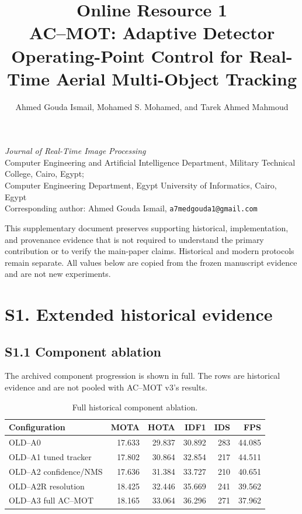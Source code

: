 \documentclass[11pt]{article}
\title{Online Resource 1\\[2pt]
AC--MOT: Adaptive Detector Operating-Point Control for Real-Time Aerial Multi-Object Tracking}
\author{Ahmed Gouda Ismail, Mohamed S. Mohamed, and Tarek Ahmed Mahmoud}
\date{}
\begin{document}
\maketitle

\begin{center}
\textit{Journal of Real-Time Image Processing}\\
Computer Engineering and Artificial Intelligence Department, Military Technical College, Cairo, Egypt;\\
Computer Engineering Department, Egypt University of Informatics, Cairo, Egypt\\
Corresponding author: Ahmed Gouda Ismail, \texttt{a7medgouda1@gmail.com}
\end{center}

This supplementary document preserves supporting historical, implementation, and
provenance evidence that is not required to understand the primary contribution
or to verify the main-paper claims. Historical and modern protocols remain
separate. All values below are copied from the frozen manuscript evidence and
are not new experiments.

\section*{S1. Extended historical evidence}

\subsection*{S1.1 Component ablation}
The archived component progression is shown in full. The rows are historical
evidence and are not pooled with AC--MOT v3's results.

\begin{table}[ht]
\centering\small
\caption{Full historical component ablation.}
\label{tab:s1-ablation}
\begin{tabular}{lrrrrr}
\toprule
Configuration & MOTA & HOTA & IDF1 & IDS & FPS\\
\midrule
OLD--A0 & 17.633 & 29.837 & 30.892 & 283 & 44.085\\
OLD--A1 tuned tracker & 17.802 & 30.864 & 32.854 & 217 & 44.511\\
OLD--A2 confidence/NMS & 17.636 & 31.384 & 33.727 & 210 & 40.651\\
OLD--A2R resolution & 18.425 & 32.446 & 35.669 & 241 & 39.562\\
OLD--A3 full AC--MOT & 18.165 & 33.064 & 36.296 & 271 & 37.962\\
\bottomrule
\end{tabular}
\end{table}
\end{document}
